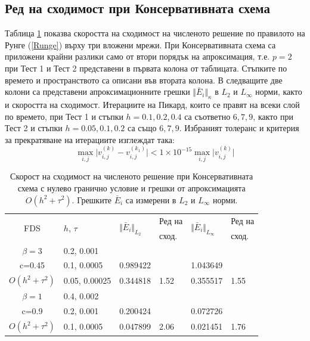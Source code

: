 \documentclass{article}
\newcommand{\be}{\begin{equation}}
\newcommand{\ee}{\end{equation}}
\newcommand{\rf}[1]{(\ref{#1})}
\begin{document}
\subsection{Ред на сходимост при Консервативната схема}
Таблица \ref{tableC} показва скоростта на сходимост на численото решение по правилото на Рунге \rf{Runge} върху три вложени мрежи. При Консервативната схема са приложени крайни разлики само от втори порядък на апроксимация, т.е. $p=2$ при Тест 1 и Тест 2 представени в първата колона от таблицата. Стъпките по времето и пространството са описани във втората колона. В следващите две колони са представени апроксимационните грешки  $\Vert \bar E_i \Vert_\kappa$ в $L_2$ и $L_{\infty}$ норми, както и скоростта на сходимост. Итерациите на Пикард, които се правят на всеки слой по времето, при Тест 1 и стъпки $h=0.1, 0.2, 0.4$ са съответно $6, 7, 9$, както при Тест 2 и стъпки $h=0.05, 0.1, 0.2$ са също $6, 7, 9$. Избраният толеранс и критерия за прекратяване на итерациите изглеждат така:
\be
\max_{i,j} \vert v_{i,j}^{(k)} - v_{i,j}^{(k_1)} \vert < 1 \times 10^{-15} \max_{i,j} \vert v_{i,j}^{(k)} \vert
\ee

\begin{table}[ht]
\centering
\small
		\begin{tabular}{||c|l|ll|ll||}
			\hline
			\hline
      \multirow{2  }{*}{FDS}        & \multirow{2  }{*}{$h$, $\tau$}  &	\multirow{2  }{*}{  $\Vert \bar E_i \Vert_{L_2} $ } 	&Ред на & \multirow{2  }{*}{  $\Vert \bar E_i \Vert_{L_\infty}$ }	&Ред на   \\
	                                        &                                                &    										&  сход. & 										& сход. \\
   			\hline 
					\hline 
  $\beta=3$                &0.2, 0.001         &                    &                &                  &                   \\
   c=0.45                     &0.1, 0.0005         & 0.989422   &                & 1.043649  &                   \\
     $O(h^2 + \tau^ 2)$ &0.05, 0.00025  &0.344818    & 1.52       & 0.355517   &   1.55   \\
	   \hline
			\hline 
       $\beta=1$           & 0.4, 0.002       &                   &           &                 &   \\
                  c=0.9       & 0.2, 0.001        & 0.200424   &          &0.072726  &   \\
  $O(h^2+ \tau^2)$  & 0.1, 0.0005       & 0.047899   & 2.06  &0.021451  & 1.76 \\
	   \hline
			\hline 
		\end{tabular}
		\caption{Скорост на сходимост на численото решение при Консервативната схема с нулево гранично условие и грешки от апроксимацията $O(h^{2} + \tau^2 )$. Грешките $\bar E_i$ са измерени в $L_2$ и $L_\infty$ норми.}
\label{tableC}
\end{table}
\end{document}
